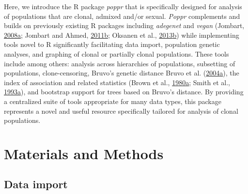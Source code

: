 \documentclass[double,12pt]{beavtex}
\begin{document}
  Here, we introduce the R package \emph{poppr} that is specifically
  designed for analysis of populations that are clonal, admixed and/or
  sexual. \emph{Poppr} complements and builds on previously existing R
  packages including \emph{adegenet} and \emph{vegan} (Jombart,
  \protect\hyperlink{ref-Jombart:2008}{2008}\protect\hyperlink{ref-Jombart:2008}{a};
  Jombart and Ahmed,
  \protect\hyperlink{ref-Jombart:2011}{2011}\protect\hyperlink{ref-Jombart:2011}{b};
  Oksanen et al.,
  \protect\hyperlink{ref-vegan}{2013}\protect\hyperlink{ref-vegan}{b})
  while implementing tools novel to R significantly facilitating data
  import, population genetic analyses, and graphing of clonal or partially
  clonal populations. These tools include among others: analysis across
  hierarchies of populations, subsetting of populations, clone-censoring,
  Bruvo's genetic distance Bruvo et al.
  (\protect\hyperlink{ref-Bruvo:2004}{2004}\protect\hyperlink{ref-Bruvo:2004}{a}),
  the index of association and related statistics (Brown et al.,
  \protect\hyperlink{ref-Brown:1980}{1980}\protect\hyperlink{ref-Brown:1980}{a};
  Smith et al.,
  \protect\hyperlink{ref-Smith:1993}{1993}\protect\hyperlink{ref-Smith:1993}{a}),
  and bootstrap support for trees based on Bruvo's distance. By providing
  a centralized suite of tools appropriate for many data types, this
  package represents a novel and useful resource specifically tailored for
  analysis of clonal populations.
  
  \section{Materials and Methods}\label{materials-and-methods}
  
  \subsection{Data import}\label{data-import}
  
\end{document}
